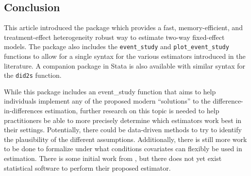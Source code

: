 \hypertarget{conclusion}{%
\subsection{Conclusion}\label{conclusion}}

This article introduced the package  which provides a
fast, memory-efficient, and treatment-effect heterogeneity robust way to
estimate two-way fixed-effect models. The package also includes the
\texttt{event\_study} and \texttt{plot\_event\_study} functions to allow
for a single syntax for the various estimators introduced in the
literature. A companion package in Stata is also available with similar
syntax for the \texttt{did2s} function.

While this package includes an event\_study function that aims to help
individuals implement any of the proposed modern ``solutions'' to the
difference-in-differences estimation, further research on this topic is
needed to help practitioners be able to more precisely determine which
estimators work best in their settings. Potentially, there could be
data-driven methods to try to identify the plausibility of the different
assumptions. Additionally, there is still more work to be done to
formalize under what conditions covariates can flexibly be used in
estimation. There is some initial work from
\citet{Caetano_Callaway_Payne_Rodrigues_2022}, but there does not yet
exist statistical software to perform their proposed estimator.



\address{%
Kyle Butts\\
University of Colorado Boulder\\%
\\
%
\url{https://www.kylebutts.com/}\\%
\textit{ORCiD: \href{https://orcid.org/0000-0002-9048-8059}{0000-0002-9048-8059}}\\%
\href{mailto:buttskyle96@gmail.com}{\nolinkurl{buttskyle96@gmail.com}}%
}

\address{%
John Gardner\\
University of Mississippi\\%
\\
%
\url{https://jrgcmu.github.io/}\\%
%
\href{mailto:jrgardne@olemiss.edu}{\nolinkurl{jrgardne@olemiss.edu}}%
}
